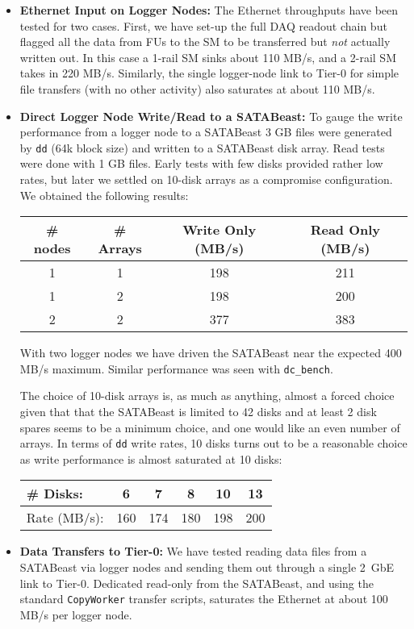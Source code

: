 \begin{itemize}
  \item {\bf Ethernet Input on Logger Nodes:} The Ethernet throughputs have been tested for two cases.
First, we have set-up the full DAQ readout chain but flagged all the data from FUs to the SM
to be transferred but {\it not} actually written out. In this case a 1-rail SM sinks about 110 MB/s,
and a 2-rail SM takes in 220 MB/s.
Similarly, the single logger-node link to Tier-0 for simple file transfers (with no other activity)
also saturates  at about  110 MB/s.
  \item {\bf Direct Logger Node Write/Read to a SATABeast:} To gauge the write performance 
from a logger node to a SATABeast 3 GB files were generated by \verb+dd+ (64k block size)
and written to a  SATABeast disk array. Read tests were done with 1 GB files. 
Early tests with few disks provided rather low rates, but
later we settled on 10-disk arrays as a compromise configuration. 
We obtained the following results:
\begin{center}
\begin{tabular}{c|c|c|c}
\# nodes   & \# Arrays & Write Only (MB/s) & Read Only (MB/s) \\ \hline
1          &     1     &     198           &    211\\
1          &     2     &     198           &    200\\
2          &     2     &     377           &    383\\ \hline
\end{tabular}
\label{tab:ddrates}
\end{center}
With two logger nodes we have driven the SATABeast near the expected 400 MB/s maximum.
Similar performance was seen with \verb+dc_bench+.

The choice of 10-disk arrays is, as much as anything, almost a forced choice
given that that the SATABeast is limited to 42 disks and at least 2 disk spares
seems to be a minimum choice, and one would like an even number of arrays.
In terms of \verb+dd+ write rates, 10 disks turns out to be a reasonable choice as 
write performance is almost saturated at 10 disks:
\begin{center}
\begin{tabular}{l|c|c|c|c|c} \hline
\# Disks:      &   6    &   7    & 8    & 10   &   13\\ \hline
Rate (MB/s):   & 160    & 174    & 180  & 198  &  200\\ \hline
\end{tabular}
\label{tab:ddrates2}
\end{center}
  \item {\bf Data Transfers to Tier-0:} We have tested reading data files from
a  SATABeast via logger nodes and sending them out through a single  2~GbE link
to Tier-0.
Dedicated read-only from the SATABeast, and using the standard \verb+CopyWorker+
transfer scripts, saturates the Ethernet at about 100 MB/s per logger node.
\end{itemize}

